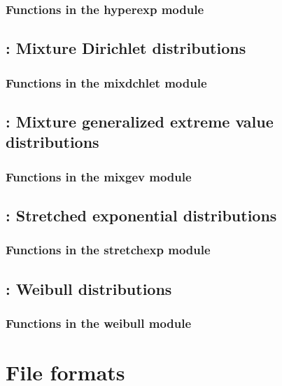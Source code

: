 \documentclass[11pt]{book}
\begin{document}
\subsection{Functions in the hyperexp module}


\newpage
\section{: Mixture Dirichlet distributions}
%
\subsection{Functions in the mixdchlet module}
%

\newpage
\section{: Mixture generalized extreme value distributions}
%
\subsection{Functions in the mixgev module}


\newpage
\section{: Stretched exponential distributions}

\subsection{Functions in the stretchexp module}


\newpage
\section{: Weibull distributions}

\subsection{Functions in the weibull module}







\newpage
\chapter{File formats}
\end{document}
